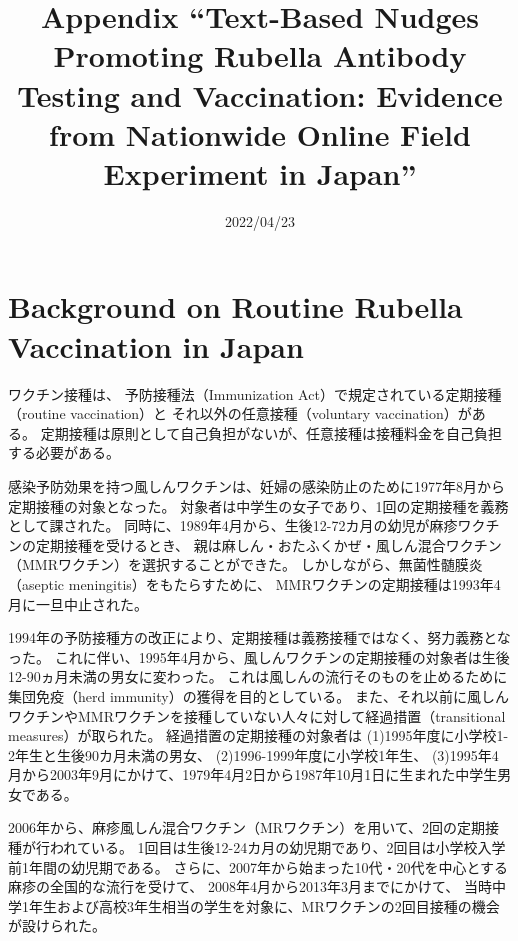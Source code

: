 \documentclass[
  11pt,
  a4paper,
]{article}
\title{Appendix
``Text-Based Nudges Promoting Rubella Antibody Testing and Vaccination:
Evidence from Nationwide Online Field Experiment in Japan''  }
\date{2022/04/23}
\begin{document}
\begin{spacing}{1}
  \maketitle
\end{spacing}

{
\setcounter{tocdepth}{2}
\tableofcontents
}
\clearpage

\hypertarget{appendix-appendix}{%
\appendix}


\hypertarget{background-on-routine-rubella-vaccination-in-japan}{%
\section{Background on Routine Rubella Vaccination in Japan}\label{background-on-routine-rubella-vaccination-in-japan}}

ワクチン接種は、
予防接種法（Immunization Act）で規定されている定期接種（routine vaccination）と
それ以外の任意接種（voluntary vaccination）がある。
定期接種は原則として自己負担がないが、任意接種は接種料金を自己負担する必要がある。

感染予防効果を持つ風しんワクチンは、妊婦の感染防止のために1977年8月から定期接種の対象となった。
対象者は中学生の女子であり、1回の定期接種を義務として課された。
同時に、1989年4月から、生後12-72カ月の幼児が麻疹ワクチンの定期接種を受けるとき、
親は麻しん・おたふくかぜ・風しん混合ワクチン（MMRワクチン）を選択することができた。
しかしながら、無菌性髄膜炎（aseptic meningitis）をもたらすために、
MMRワクチンの定期接種は1993年4月に一旦中止された。

1994年の予防接種方の改正により、定期接種は義務接種ではなく、努力義務となった。
これに伴い、1995年4月から、風しんワクチンの定期接種の対象者は生後12-90ヵ月未満の男女に変わった。
これは風しんの流行そのものを止めるために集団免疫（herd immunity）の獲得を目的としている。
また、それ以前に風しんワクチンやMMRワクチンを接種していない人々に対して経過措置（transitional measures）が取られた。
経過措置の定期接種の対象者は
(1)1995年度に小学校1-2年生と生後90カ月未満の男女、
(2)1996-1999年度に小学校1年生、
(3)1995年4月から2003年9月にかけて、1979年4月2日から1987年10月1日に生まれた中学生男女である。

2006年から、麻疹風しん混合ワクチン（MRワクチン）を用いて、2回の定期接種が行われている。
1回目は生後12-24カ月の幼児期であり、2回目は小学校入学前1年間の幼児期である。
さらに、2007年から始まった10代・20代を中心とする麻疹の全国的な流行を受けて、
2008年4月から2013年3月までにかけて、
当時中学1年生および高校3年生相当の学生を対象に、MRワクチンの2回目接種の機会が設けられた。
\end{document}
